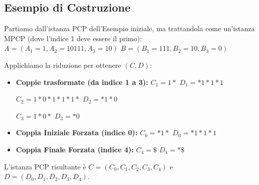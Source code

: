 \documentclass[a4paper, 11pt]{book} %
\theoremstyle{definition}
\begin{document}
\subsection{Esempio di Costruzione}
Partiamo dall'istanza PCP dell'Esempio iniziale, ma trattandola come un'istanza MPCP (dove l'indice 1 deve essere il primo):
$A = (A_1 = 1, A_2 = 10111, A_3 = 10)$
$B = (B_1 = 111, B_2 = 10, B_3 = 0)$

Applichiamo la riduzione per ottenere $(C, D)$:
\begin{itemize}
    \item \textbf{Coppie trasformate (da indice 1 a 3):}
    $C_1 = 1*$
    $D_1 = *1*1*1$

    $C_2 = 1*0*1*1*1*$
    $D_2 = *1*0$

    $C_3 = 1*0*$
    $D_3 = *0$

    \item \textbf{Coppia Iniziale Forzata (indice 0):}
    $C_0 = *1*$
    $D_0 = *1*1*1$

    \item \textbf{Coppia Finale Forzata (indice 4):}
    $C_4 = \$$
    $D_4 = *\$$
\end{itemize}
L'istanza PCP risultante è $C=(C_0, C_1, C_2, C_3, C_4)$ e $D=(D_0, D_1, D_2, D_3, D_4)$.
\end{document}
